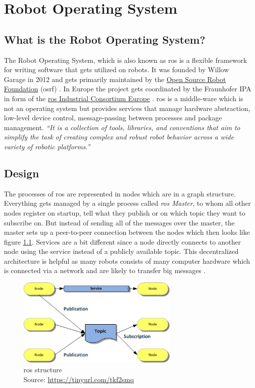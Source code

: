 
\chapter{Robot Operating System\authorA}

\section{What is the Robot Operating System?}
The Robot Operating System, which is also known as \gls{ros} is a flexible framework for writing software that gets utilized on robots. It was founded by Willow Garage in 2012 and gets primarily maintained by the \href{https://www.openrobotics.org/}{Open Source Robot Foundation} (\gls{osrf}) \cite{osrf}. In Europe the project gets coordinated by the Fraunhofer IPA in form of the \href{https://rosindustrial.org/ric-eu}{\gls{ros} Industrial Consortium Europe} \cite{rosice}. \gls{ros} is a middle-ware which is not an operating system but provides services that manage hardware abstraction, low-level device control, message-passing between processes and package management. \emph{\enquote{It is a collection of tools, libraries, and conventions that aim to simplify the task of creating complex and robust robot behavior across a wide variety of robotic platforms.}} \cite{aboutros}

\section{Design}
The processes of \gls{ros} are represented in nodes which are in a graph structure. Everything gets managed by a single process called \textit{\gls{ros} Master}, to whom all other nodes register on startup, tell what they publish or on which topic they want to subscribe on. But instead of sending all of the messages over the master, the master sets up a peer-to-peer connection between the nodes which then looks like figure \ref{rosstructure}. Services are a bit different since a node directly connects to another node using the service instead of a publicly available topic. This decentralized architecture is helpful as many robots consists of many computer hardware which is connected via a network and are likely to transfer big messages \cite{rosoneoone}. \newline
\begin{figure}[h]
	\centering
	\includegraphics[width=0.7\textwidth]{./media/images/ros_structure.jpg}
  	\caption{\gls{ros} structure
  	\\Source: \url{https://tinyurl.com/tkf2smq}}
  	\label{rosstructure}
\end{figure}

